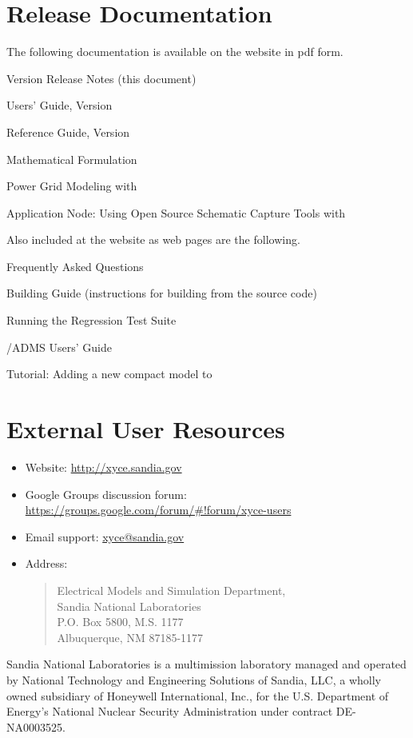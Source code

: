 \documentclass{article}
\begin{document}
\section{\Xyce{} Release \XyceVersionVar{} Documentation}
The following \Xyce{} documentation is available on the \Xyce{} website in pdf
form.
\begin{XyceItemize}
  \item \Xyce{} Version \XyceVersionVar{} Release Notes (this document)
  \item \Xyce{} Users' Guide, Version \XyceVersionVar{}
  \item \Xyce{} Reference Guide, Version \XyceVersionVar{}
  \item \Xyce{} Mathematical Formulation
  \item Power Grid Modeling with \Xyce{}
  \item Application Node: Using Open Source Schematic Capture Tools with \Xyce{}
\end{XyceItemize}
Also included at the \Xyce{} website as web pages are the following.
\begin{XyceItemize}
  \item Frequently Asked Questions
  \item Building Guide (instructions for building \Xyce{} from the source code)
  \item Running the \Xyce{} Regression Test Suite
  \item \Xyce{}/ADMS Users' Guide
  \item Tutorial:  Adding a new compact model to \Xyce{}
\end{XyceItemize}


\section{External User Resources}
\begin{itemize}
  \item Website: {\color{XyceDeepRed}\url{http://xyce.sandia.gov}}
  \item Google Groups discussion forum:
    {\color{XyceDeepRed}\url{https://groups.google.com/forum/#!forum/xyce-users}}
  \item Email support:
    {\color{XyceDeepRed}\href{mailto:xyce@sandia.gov}{xyce@sandia.gov}}
  \item Address:
    \begin{quote}
            Electrical Models and Simulation Department,\\
            Sandia National Laboratories\\
            P.O. Box 5800, M.S. 1177\\
            Albuquerque, NM 87185-1177 \\
    \end{quote}
\end{itemize}

\vspace*{\fill}
Sandia National Laboratories is a multimission laboratory managed and operated by 
National Technology and Engineering Solutions of Sandia, LLC, a wholly owned subsidiary
of Honeywell International, Inc., for the U.S. Department of Energy's National Nuclear 
Security Administration under contract DE-NA0003525.
\end{document}
